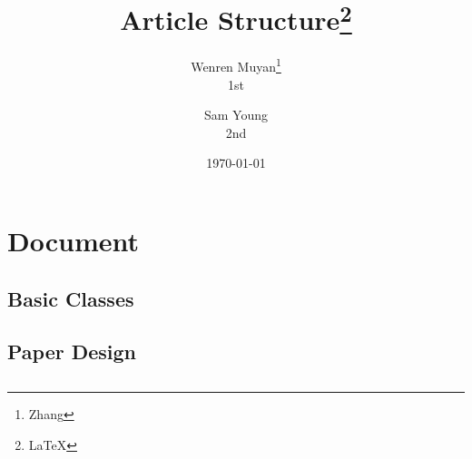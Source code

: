 \documentclass{article}
\title{Article Structure\thanks{LaTeX}}
\author{Wenren Muyan\thanks{Zhang}\\1st  \and Sam Young\\2nd}
\date{\today}
\begin{document}
    \maketitle
    \tableofcontents

    \section{Document}
        \subsection{Basic Classes}

        \subsection{Paper Design}
        
        \subsection{}
\end{document}
